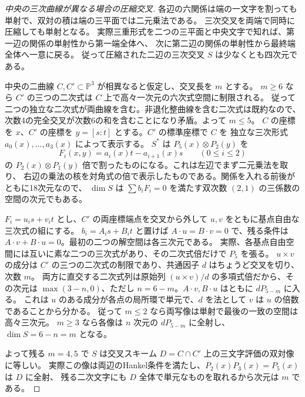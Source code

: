 \begin{proof}[中央の三次曲線が異なる場合の圧縮交叉]
各辺の六関係は端の一文字を割っても単射で、双対の積は端の三平面では二元乗法である。
三次交叉を両端で同時に圧縮しても単射となる。
実際三重形式を二つの三平面と中央文字で知れば、第一辺の関係の単射性から第一端全体へ、
次に第二辺の関係の単射性から最終端全体へ一意に戻る。
従って圧縮された二辺の三次交叉 $S$ は少なくとも四次元である。

中央の二曲線 $C,C'\subset\mathbb P^3$ が相異なると仮定し、交叉長を $m$ とする。
$m\ge6$ なら $C'$ の三つの二次式は $C$ 上で高々一次元の六次式空間に制限される。
従って二つの独立な二次式が両曲線を含む。非退化整曲線を含む二次式は既約なので、
次数4の完全交叉が次数6の和を含むことになり矛盾。よって $m\le5$。
$C$ の座標を $x$、$C'$ の座標を $y=[s:t]$ とする。$C'$ の標準座標で $C$ を
独立な三次形式 $a_0(x),\ldots,a_3(x)$ によって表示する。
$S^*$ は $P_5(x)\otimes P_2(y)$ を
\[
 F_i(x,y)=a_i(x)t-a_{i+1}(x)s\qquad (0\le i\le2)
\]
の $P_2(x)\otimes P_1(y)$ 倍で割ったものになる。これは左辺でまず二元乗法を取り、
右辺の乗法の核を対角式の倍で表示したものである。関係を入れる前後がともに18次元なので、
$\dim S$ は $\sum b_i F_i=0$ を満たす双次数 $(2,1)$ の三係数の空間の次元でもある。

$F_i=u_i s+v_i t$ とし、$C'$ の両座標端点を交叉から外して $u,v$ をともに基点自由な三次式の組にする。
$b_i=A_i s+B_i t$ と置けば $A\cdot u=B\cdot v=0$ で、残る条件は
$A\cdot v+B\cdot u=0$。最初の二つの解空間は各三次元である。
実際、各基点自由空間には互いに素な二つの三次式があり、その二次式倍だけで $P_5$ を張る。
$u\times v$ の成分は $C'$ の三つの二次式の制限であり、共通因子 $d$ はちょうど交叉を切り、次数 $m$。
両方に直交する二次式列は原始列 $(u\times v)/d$ の多項式倍だから、その次元は
$\max(3-n,0)$、ただし $n=6-m$。$A\cdot v,B\cdot u$ はともに $dP_{5-m}$ に入る。
これは $u$ のある成分が各点の局所環で単元で、$d$ を法として $v$ は $u$ の倍数であることから分かる。
従って $m\le2$ なら両写像は単射で最後の一致の空間は高々三次元。
$m\ge3$ なら各像は $n$ 次元の $dP_{5-m}$ に全射し、$\dim S=6-n=m$ となる。

よって残る $m=4,5$ で $S$ は交叉スキーム $D=C\cap C'$ 上の三文字評価の双対像に等しい。
実際この像は両辺のHankel条件を満たし、$P_2(x)P_3(x)=P_5(x)$ は $D$ に全射、
残る二次文字にも $D$ 全体で単元なものを取れるから次元は $m$ である。
\end{proof}

